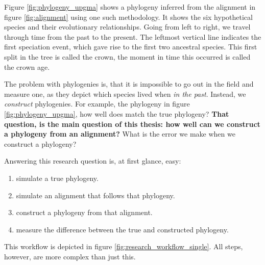 Figure \ref{fig:phylogeny_upgma} shows a phylogeny inferred
from the alignment 
in figure \ref{fig:alignment} using one such methodology.
It shows the six hypothetical species and their evolutionary 
relationships. Going from left to right, we travel through time from 
the past to the present. 
The leftmost vertical line indicates the first speciation event, 
which gave rise to the first two ancestral species. 
This first split in the tree is called the crown,
the moment in time this occurred is called the crown age.

The problem with phylogenies is, 
that it is impossible to go out in the field and measure one, 
as they depict which species lived when \emph{in the past}.
Instead, we \emph{construct} phylogenies. For example,
the phylogeny in figure \ref{fig:phylogeny_upgma}, how well
does match the true phylogeny? \textbf{That question, is the main question of this 
thesis: how well can we construct a
phylogeny from an alignment?} What is the error we
make when we construct a phylogeny?

Answering this research question is, at first glance, easy: 

\begin{enumerate}[label=\arabic*)]\itemsep2pt
  \item simulate a true phylogeny.
  \item simulate an alignment that follows that phylogeny.
  \item construct a phylogeny from that alignment.
  \item measure the difference between the true and constructed phylogeny.
\end{enumerate}

This workflow is depicted in figure \ref{fig:research_workflow_single}.
All steps, however, are more complex than just this.


